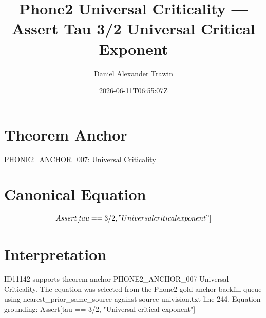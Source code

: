 \documentclass[11pt]{article}
\title{Phone2 Universal Criticality — Assert Tau 3/2 Universal Critical Exponent}
\author{Daniel Alexander Trawin}
\date{2026-06-11T06:55:07Z}
\begin{document}
\maketitle
\section*{Theorem Anchor}
PHONE2_ANCHOR_007: Universal Criticality
\section*{Canonical Equation}
\[
Assert[tau == 3/2, "Universal critical exponent"]
\]
\section*{Interpretation}
ID11142 supports theorem anchor PHONE2_ANCHOR_007 Universal Criticality. The equation was selected from the Phone2 gold-anchor backfill queue using nearest_prior_same_source against source univision.txt line 244. Equation grounding: Assert[tau == 3/2, "Universal critical exponent"]
\end{document}
